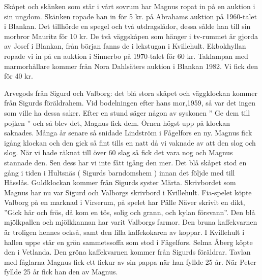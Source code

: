 Skåpet och skänken som står i vårt sovrum har Magnus ropat in på en auktion i sin ungdom. Skänken ropade han in för 5 kr. på Abrahams auktion på 1960-talet i Blankan. Det tillhörde en spegel och två utdragslådor, dessa sålde han till sin morbror Mauritz för 10 kr.
De två väggskåpen som hänger i tv-rummet är gjorda av Josef i Blankan, från början fanns de i lekstugan i Kvillehult. Ekbokhyllan ropade vi in på en auktion i Sinnerbo på 1970-talet för 60 kr.
Taklampan med marmorhållare kommer från Nora Dahlsäters auktion i Blankan 1982. Vi fick den för 40 kr.


Arvegods från Sigurd och Valborg: det blå stora skåpet och väggklockan kommer från Sigurds föräldrahem. Vid bodelningen efter hans mor,1959, så var det ingen som ville ha dessa saker. Efter en stund säger någon av syskonen ” Ge dem till pojken ” och så blev det, Magnus fick dem. Örnen högst upp på klockan saknades. Många år senare så snidade Lindström i Fågelfors en ny. Magnus fick igång klockan och den gick så fint tills en natt då vi vaknade av att den slog och slog. När vi hade räknat till över 60 slag så fick det vara nog och Magnus stannade den. Sen dess har vi inte fått igång den mer. Det blå skåpet stod en gång i tiden i Hultsnäs ( Sigurds barndomshem ) innan det följde med till Hässlås.
Guldklockan kommer från Sigurds syster Märta. Skrivbordet som Magnus har nu var Sigurd och Valborgs skrivbord i Kvillehult. Fia-spelet köpte Valborg på en marknad i Virserum, på spelet har Pälle Näver skrivit en dikt, ”Gick här och frös, då kom en tös, solig och grann, och kylan försvann”.
Den blå mjölkpallen och mjölkkannan har varit Valborgs farmor. Den bruna kaffekvarnen är troligen hennes också, samt den lilla kaffekokaren av koppar. I Kvillehult i hallen uppe står en grön sammetssoffa som stod i Fågelfors. Selma Åberg köpte den i Vetlanda. Den gröna kaffekvarnen kommer från Sigurds föräldrar.
Tavlan med fåglarna
Magnus fick ett fickur av sin pappa när han fyllde 25 år. När Peter fyllde 25 år fick han den av Magnus.

